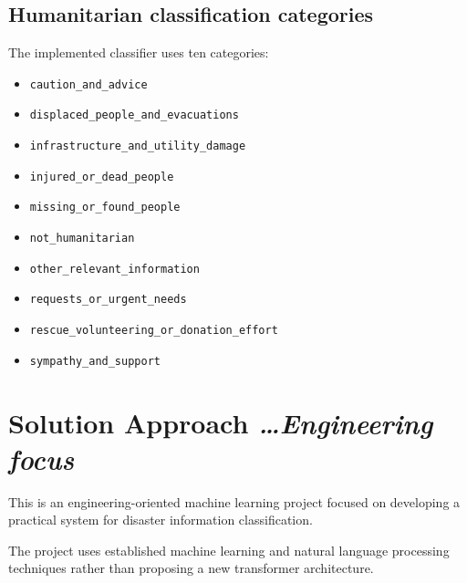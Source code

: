 \documentclass[11pt,a4paper]{article}
\newcommand{\BvrHint}[1]{%
  {\normalfont\normalsize\itshape\hfill #1}}
\begin{document}
\subsection{Humanitarian classification categories}

The implemented classifier uses ten categories:

\begin{itemize}[leftmargin=0.7cm]

    \item \texttt{caution\_and\_advice}

    \item \texttt{displaced\_people\_and\_evacuations}

    \item \texttt{infrastructure\_and\_utility\_damage}

    \item \texttt{injured\_or\_dead\_people}

    \item \texttt{missing\_or\_found\_people}

    \item \texttt{not\_humanitarian}

    \item \texttt{other\_relevant\_information}

    \item \texttt{requests\_or\_urgent\_needs}

    \item \texttt{rescue\_volunteering\_or\_donation\_effort}

    \item \texttt{sympathy\_and\_support}

\end{itemize}


\section{Solution Approach %
\BvrHint{\ldots Engineering focus}}

This is an engineering-oriented machine learning project focused on
developing a practical system for disaster information classification.

The project uses established machine learning and natural language processing
techniques rather than proposing a new transformer architecture.
\end{document}
